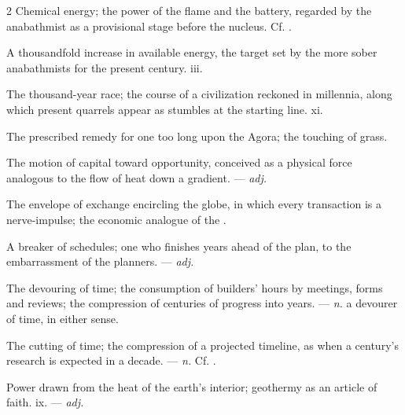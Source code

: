 \begin{multicols}{2}
 Chemical energy; the power of the flame and the battery, regarded by the anabathmist as a provisional stage before the nucleus. Cf. .

 A thousandfold increase in available energy, the target set by the more sober anabathmists for the present century.   iii.

 The thousand-year race; the course of a civilization reckoned in millennia, along which present quarrels appear as stumbles at the starting line.   xi.

  The prescribed remedy for one too long upon the Agora; the touching of grass. 

 The motion of capital toward opportunity, conceived as a physical force analogous to the flow of heat down a gradient. —  \textit{adj.}

 The envelope of exchange encircling the globe, in which every transaction is a nerve-impulse; the economic analogue of the .

 A breaker of schedules; one who finishes years ahead of the plan, to the embarrassment of the planners. —  \textit{adj.}

 The devouring of time;   the consumption of builders' hours by meetings, forms and reviews;   the compression of centuries of progress into years. —  \textit{n.} a devourer of time, in either sense.

 The cutting of time; the compression of a projected timeline, as when a century's research is expected in a decade. —  \textit{n.} Cf. .

 Power drawn from the heat of the earth's interior; geothermy as an article of faith.   ix. —  \textit{adj.}


\end{multicols}
